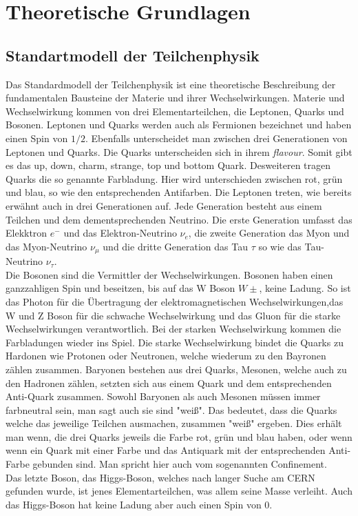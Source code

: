 \section{Theoretische Grundlagen} \label{grundlagen}

\subsection{Standartmodell der Teilchenphysik} \label{standartmodell}
Das Standardmodell der Teilchenphysik ist eine theoretische Beschreibung der fundamentalen Bausteine der Materie und ihrer Wechselwirkungen.
Materie und Wechselwirkung kommen von drei Elementarteilchen, die Leptonen, Quarks und Bosonen. 
Leptonen und Quarks werden auch als Fermionen bezeichnet und haben einen Spin von $1/2$. 
Ebenfalls unterscheidet man zwischen drei Generationen von Leptonen und Quarks. 
Die Quarks unterscheiden sich in ihrem \textit{flavour}. 
Somit gibt es das up, down, charm, strange, top und bottom Quark. 
Desweiteren tragen Quarks die so genannte Farbladung.
Hier wird unterschieden zwischen rot, grün und blau, so wie den entsprechenden Antifarben. 
Die Leptonen treten, wie bereits erwähnt auch in drei Generationen auf. 
Jede Generation besteht aus einem Teilchen und dem dementsprechenden Neutrino. 
Die erste Generation umfasst das Elekktron $e^{-}$ und das Elektron-Neutrino $\nu_e$, die zweite Generation das Myon und das Myon-Neutrino $\nu_{\mu}$ und die dritte Generation das Tau $\tau$ so wie das Tau-Neutrino $\nu_{\tau}$.\\
\newline 
Die Bosonen sind die Vermittler der Wechselwirkungen. 
Bosonen haben einen ganzzahligen Spin und beseitzen, bis auf das W Boson $W\pm$, keine Ladung. 
So ist das Photon für die Übertragung der elektromagnetischen Wechselwirkungen,das W und Z Boson für die schwache Wechselwirkung und das Gluon für die starke Wechselwirkungen verantwortlich. 
Bei der starken Wechselwirkung kommen die Farbladungen wieder ins Spiel. 
Die starke Wechselwirkung bindet die Quarks zu Hardonen wie Protonen oder Neutronen, welche wiederum zu den Bayronen zählen zusammen.
Baryonen bestehen aus drei Quarks, Mesonen, welche auch zu den Hadronen zählen, setzten sich aus einem Quark und dem entsprechenden Anti-Quark zusammen. 
Sowohl Baryonen als auch Mesonen müssen immer farbneutral sein, man sagt auch sie sind "weiß". 
Das bedeutet, dass die Quarks welche das jeweilige Teilchen ausmachen, zusammen "weiß" ergeben. 
Dies erhält man wenn, die drei Quarks jeweils die Farbe rot, grün und blau haben, oder wenn wenn ein Quark mit einer Farbe und das Antiquark mit der entsprechenden Anti-Farbe gebunden sind.
Man spricht hier auch vom sogenannten Confinement. \\
Das letzte Boson, das Higgs-Boson, welches nach langer Suche am CERN gefunden wurde, ist jenes Elementarteilchen, was allem seine Masse verleiht. Auch das Higgs-Boson hat keine Ladung aber auch einen Spin von 0.

